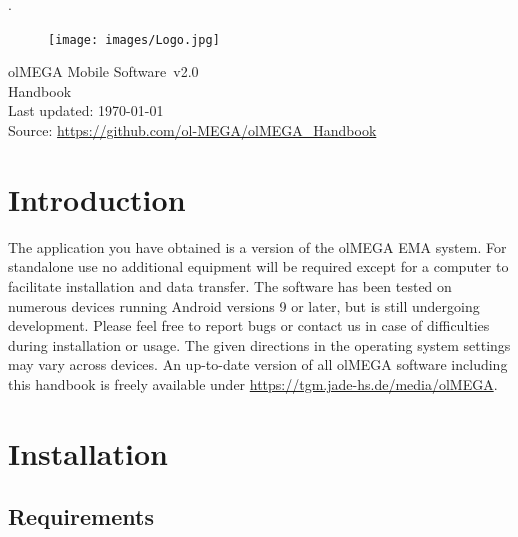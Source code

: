 \documentclass[11pt,a4paper,titlepage]{article}
\newcommand{\titleFull}{olMEGA Mobile Software}
\newcommand{\version}{v2.0}
\begin{document}
 
\pagestyle{empty}

\sffamily
\mdseries


\textcolor[rgb]{1,1,1}{.}
	\vspace{3cm}
	\begin{center}
	
	\begin{figure}[h]
		\centering
			\texttt{[image: images/Logo.jpg]}
	\end{figure}
	\vspace{3cm}
	\Huge
	\titleFull \ \version
	\normalsize
	\\
	\vspace{1cm}
	Handbook\\
	\vspace{1cm}
	Last updated: \today\\
	\vspace{1cm}
	Source: \url{https://github.com/ol-MEGA/olMEGA_Handbook}
	\vfill
	\end{center}

%
\clearpage

\tableofcontents

\clearpage

\setcounter{page}{1}
\pagestyle{fancy}

\section{Introduction}

The application you have obtained is a version of the olMEGA EMA system. For standalone use no additional equipment will be required except for a computer to facilitate installation and data transfer. The software has been tested on numerous devices running Android versions 9 or later, but is still undergoing development. Please feel free to report bugs or contact us in case of difficulties during installation or usage. The given directions in the operating system settings may vary across devices. An up-to-date version of all olMEGA software including this handbook is freely available under \url{https://tgm.jade-hs.de/media/olMEGA}.


\section{Installation}


\subsection{Requirements}
\end{document}
